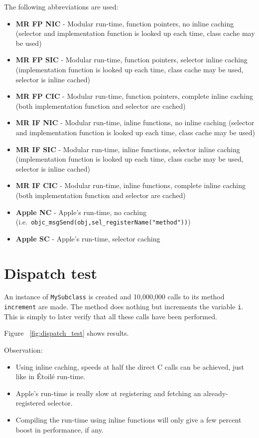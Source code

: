 The following abbreviations are used:
\begin{itemize}
  \item{\bf{MR FP NIC}} - Modular run-time, function pointers, no inline caching (selector and implementation function is looked up each time, class cache may be used)
  \item{\bf{MR FP SIC}} - Modular run-time, function pointers, selector inline caching (implementation function is looked up each time, class cache may be used, selector is inline cached)
  \item{\bf{MR FP CIC}} - Modular run-time, function pointers, complete inline caching (both implementation function and selector are cached)
  \item{\bf{MR IF NIC}} - Modular run-time, inline functions, no inline caching (selector and implementation function is looked up each time, class cache may be used)
  \item{\bf{MR IF SIC}} - Modular run-time, inline functions, selector inline caching (implementation function is looked up each time, class cache may be used, selector is inline cached)
  \item{\bf{MR IF CIC}} - Modular run-time, inline functions, complete inline caching (both implementation function and selector are cached)
  \item{\bf{Apple NC}} - Apple's run-time, no caching (i.e.\ \verb=objc_msgSend(obj,=\newline{}\verb=sel_registerName("method"))=)
  \item{\bf{Apple SC}} - Apple's run-time, selector caching 
\end{itemize}

\section{Dispatch test}

An instance of \verb=MySubclass= is created and 10,000,000 calls to its method \verb=increment= are made. The method does nothing but increments the variable \verb=i=. This is simply to later verify that all these calls have been performed.

Figure ~\ref{fig:dispatch_test} shows results.

Observation:

\begin{itemize}
  \item Using inline caching, speeds at half the direct C calls can be achieved, just like in \'Etoil\'e run-time.
  \item Apple's run-time is really slow at registering and fetching an already-registered selector.
  \item Compiling the run-time using inline functions will only give a few percent boost in performance, if any.
\end{itemize}

